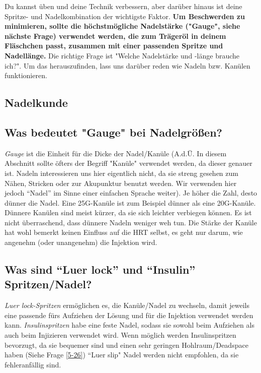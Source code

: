 \documentclass{article}
\begin{document}
{Du kannst üben und deine Technik verbessern, aber darüber hinaus ist deine Spritze- und Nadelkombination der wichtigste Faktor. \textbf{Um Beschwerden zu minimieren, sollte die höchstmögliche Nadelstärke ("Gauge", siehe nächste Frage) verwendet werden, die zum Trägeröl in deinem Fläschchen passt, zusammen mit einer passenden Spritze und Nadellänge. }Die richtige Frage ist "Welche Nadelstärke und -länge brauche ich?". Um das herauszufinden, lass uns darüber reden wie Nadeln bzw. Kanülen funktionieren.

\subsection*{Nadelkunde}

\subsection{Was bedeutet "Gauge" bei Nadelgrößen?}

\textit{Gauge }ist die Einheit für die Dicke der Nadel/Kanüle (A.d.Ü. In diesem Abschnitt sollte öfters der Begriff "Kanüle" verwendet werden, da dieser genauer ist. Nadeln interessieren uns hier eigentlich nicht, da sie streng gesehen zum Nähen, Stricken oder zur Akupunktur benutzt werden. Wir verwenden hier jedoch “Nadel” im Sinne einer einfachen Sprache weiter). Je höher die Zahl, desto dünner die Nadel. Eine 25G-Kanüle ist zum Beispiel dünner als eine 20G-Kanüle. Dünnere Kanülen sind meist kürzer, da sie sich leichter verbiegen können. Es ist nicht überraschend, dass dünnere Nadeln weniger weh tun. Die Stärke der Kanüle hat wohl bemerkt keinen Einfluss auf die HRT selbst, es geht nur darum, wie angenehm (oder unangenehm) die Injektion wird.

\subsection{Was sind “Luer lock” und “Insulin” Spritzen/Nadel?}\label{5-13}

\textit{Luer lock-Spritzen} ermöglichen es, die Kanüle/Nadel zu wechseln, damit jeweils eine passende fürs Aufziehen der Lösung und für die Injektion verwendet werden kann. \textit{Insulinspritzen} habe eine feste Nadel, sodass sie sowohl beim Aufziehen als auch beim Injizieren verwendet wird. Wenn möglich werden Insulinspritzen bevorzugt, da sie bequemer sind und einen sehr geringen Hohlraum/Deadspace haben (Siehe Frage \ref{5-26}) “Luer slip" Nadel werden nicht empfohlen, da sie fehleranfällig sind.

}
\end{document}

